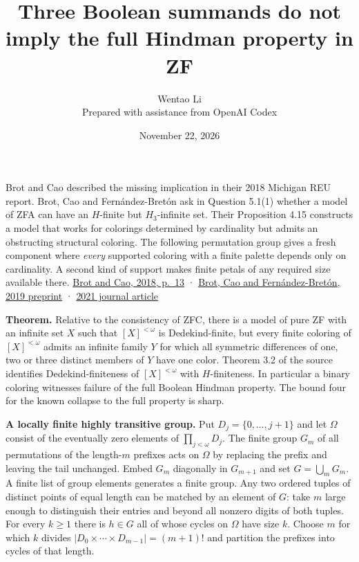 \documentclass[11pt]{article}
\author{Wentao Li\\\small Prepared with assistance from OpenAI Codex}
\date{November 22, 2026}
\title{Three Boolean summands do not imply the full Hindman property in ZF}
\begin{document}
\maketitle
Brot and Cao described the missing implication in their 2018 Michigan REU report. Brot, Cao and Fernández-Bretón ask in Question 5.1(1) whether a model of ZFA can have an \(H\)-finite but \(H_3\)-infinite set. Their Proposition 4.15 constructs a model that works for colorings determined by cardinality but admits an obstructing structural coloring. The following permutation group gives a fresh component where \emph{every} supported coloring with a finite palette depends only on cardinality. A second kind of support makes finite petals of any required size available there. \href{https://lsa.umich.edu/content/dam/math-assets/math-document/reu-documents/2018FinalPapers/Brot\%20and\%20Cao.pdf}{Brot and Cao, 2018, p.~13} · \href{https://arxiv.org/abs/1910.11025}{Brot, Cao and Fernández-Bretón, 2019 preprint} · \href{https://doi.org/10.1016/j.apal.2021.102961}{2021 journal article}

\textbf{Theorem.} Relative to the consistency of ZFC, there is a model of pure ZF with an infinite set \(X\) such that \([X]^{<\omega}\) is Dedekind-finite, but every finite coloring of \([X]^{<\omega}\) admits an infinite family \(Y\) for which all symmetric differences of one, two or three distinct members of \(Y\) have one color. Theorem 3.2 of the source identifies Dedekind-finiteness of \([X]^{<\omega}\) with \(H\)-finiteness. In particular a binary coloring witnesses failure of the full Boolean Hindman property. The bound four for the known collapse to the full property is sharp.

\textbf{A locally finite highly transitive group.} Put \(D_j=\{0,\ldots,j+1\}\) and let \(\Omega\) consist of the eventually zero elements of \(\prod_{j<\omega}D_j\). The finite group \(G_m\) of all permutations of the length-\(m\) prefixes acts on \(\Omega\) by replacing the prefix and leaving the tail unchanged. Embed \(G_m\) diagonally in \(G_{m+1}\) and set \(G=\bigcup_m G_m\). A finite list of group elements generates a finite group. Any two ordered tuples of distinct points of equal length can be matched by an element of \(G\): take \(m\) large enough to distinguish their entries and beyond all nonzero digits of both tuples. For every \(k\ge1\) there is \(h\in G\) all of whose cycles on \(\Omega\) have size \(k\). Choose \(m\) for which \(k\) divides \(|D_0\times\cdots\times D_{m-1}|=(m+1)!\) and partition the prefixes into cycles of that length.
\end{document}
